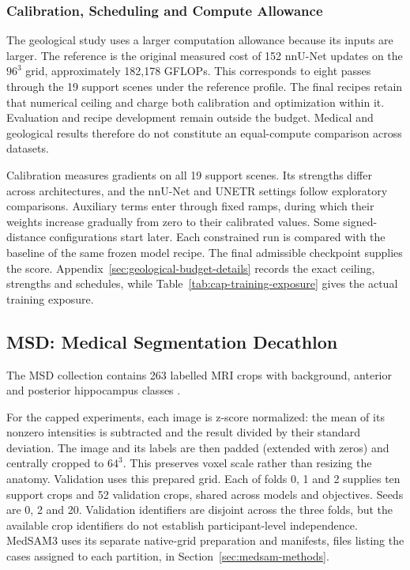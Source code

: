 \documentclass[12pt,a4paper]{article}
\begin{document}
\subsubsection{Calibration, Scheduling and Compute Allowance}

The geological study uses a larger computation allowance because its
inputs are larger. The reference is the original measured cost of 152
nnU-Net updates on the $96^3$ grid, approximately 182,178 GFLOPs. This
corresponds to eight passes through the 19 support scenes under the
reference profile. The final recipes retain that numerical ceiling and
charge both calibration and optimization within it. Evaluation and recipe
development remain outside the budget. Medical and geological results
therefore do not constitute an equal-compute comparison across datasets.

Calibration measures gradients on all 19 support scenes. Its strengths
differ across architectures, and the nnU-Net and UNETR settings follow
exploratory comparisons. Auxiliary terms enter through fixed ramps, during
which their weights increase gradually from zero to their calibrated values.
Some signed-distance configurations start later. Each constrained run is
compared with the baseline of the same frozen model recipe. The final
admissible checkpoint supplies the score.
Appendix~\ref{sec:geological-budget-details} records the exact ceiling,
strengths and schedules, while Table~\ref{tab:cap-training-exposure} gives
the actual training exposure.

\subsection{MSD: Medical Segmentation Decathlon}
\label{sec:msd-data-methods}


The MSD collection contains 263 labelled MRI crops with background,
anterior and posterior hippocampus classes \cite{simpson2019dataset}.

For the capped experiments, each image is z-score normalized: the mean of
its nonzero intensities is subtracted and the result divided by their
standard deviation. The image and its labels are then padded (extended with
zeros) and centrally cropped to $64^3$. This preserves voxel scale rather
than resizing the anatomy. Validation uses this prepared grid. Each of folds
0, 1 and 2 supplies ten support crops and 52 validation crops, shared across
models and objectives. Seeds are 0, 2 and 20. Validation identifiers are
disjoint across the three folds, but the available crop identifiers do not
establish participant-level independence. MedSAM3 uses its separate
native-grid preparation and manifests, files listing the cases assigned to
each partition, in Section~\ref{sec:medsam-methods}.
\end{document}
